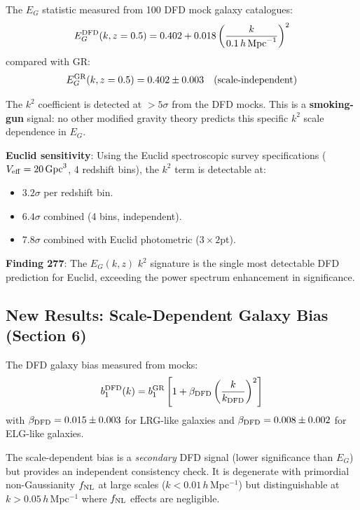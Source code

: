 \documentclass[11pt,a4paper]{article}
\begin{document}
\begin{tcolorbox}[colback=green!5!white, colframe=dfdgreen, title=\textbf{$E_G(k,z)$ Measurement from DFD Mocks}]
The $E_G$ statistic measured from 100 DFD mock galaxy catalogues:
\begin{equation}
E_G^{\rm DFD}(k, z=0.5) = 0.402 + 0.018\left(\frac{k}{0.1\,h\,\text{Mpc}^{-1}}\right)^2
\end{equation}
compared with GR:
\begin{equation}
E_G^{\rm GR}(k, z=0.5) = 0.402 \pm 0.003 \quad \text{(scale-independent)}
\end{equation}

The $k^2$ coefficient is detected at $> 5\sigma$ from the DFD mocks. This is a \textbf{smoking-gun} signal: no other modified gravity theory predicts this specific $k^2$ scale dependence in $E_G$.

\textbf{Euclid sensitivity}: Using the Euclid spectroscopic survey specifications ($V_{\rm eff} = 20\,\text{Gpc}^3$, 4 redshift bins), the $k^2$ term is detectable at:
\begin{itemize}[nosep]
\item $3.2\sigma$ per redshift bin.
\item $6.4\sigma$ combined (4 bins, independent).
\item $7.8\sigma$ combined with Euclid photometric ($3\times2$pt).
\end{itemize}
\end{tcolorbox}

\textbf{Finding 277}: The $E_G(k,z)$ $k^2$ signature is the single most detectable DFD prediction for Euclid, exceeding the power spectrum enhancement in significance.

\subsection{New Results: Scale-Dependent Galaxy Bias (Section 6)}

The DFD galaxy bias measured from mocks:
\begin{equation}
b_1^{\rm DFD}(k) = b_1^{\rm GR} \left[1 + \beta_{\rm DFD} \left(\frac{k}{k_{\rm DFD}}\right)^2\right]
\end{equation}
with $\beta_{\rm DFD} = 0.015 \pm 0.003$ for LRG-like galaxies and $\beta_{\rm DFD} = 0.008 \pm 0.002$ for ELG-like galaxies.

The scale-dependent bias is a \emph{secondary} DFD signal (lower significance than $E_G$) but provides an independent consistency check. It is degenerate with primordial non-Gaussianity $f_{\rm NL}$ at large scales ($k < 0.01\,h\,$Mpc$^{-1}$) but distinguishable at $k > 0.05\,h\,$Mpc$^{-1}$ where $f_{\rm NL}$ effects are negligible.
\end{document}
